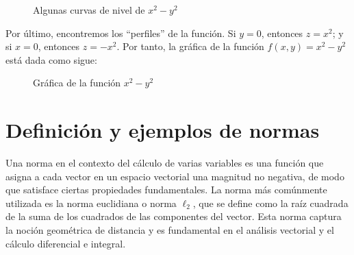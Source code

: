 \begin{example}
\begin{figure}[h!]
{
        } \hfill
        \caption{Algunas curvas de nivel de $x^2 - y^2$}
    \end{figure}
    \newpage
    \noindent Por último, encontremos los “perfiles” de la función. Si $y = 0$, entonces $z = x^2$; y si $x = 0$, entonces $z = -x^2$. Por tanto, la gráfica de la función $f(x, y) = x^{2} - y^{2}$ está dada como sigue:
    \begin{figure}[h!]
        \centering
        \caption{Gráfica de la función $x^2 - y^2$}
    \end{figure}
\end{example}

\section{Definición y ejemplos de normas}

Una norma en el contexto del cálculo de varias variables es una función que asigna a cada vector en un espacio vectorial una magnitud no negativa, de modo que satisface ciertas propiedades fundamentales. La norma más comúnmente utilizada es la norma euclidiana o norma $\ell_2$, que se define como la raíz cuadrada de la suma de los cuadrados de las componentes del vector. Esta norma captura la noción geométrica de distancia y es fundamental en el análisis vectorial y el cálculo diferencial e integral.

